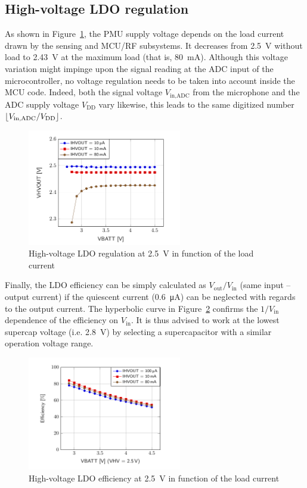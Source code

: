 \documentclass{EPL-master-thesis-covers-EN}
\newcommand{\te}[1]{\textrm{#1}}
\DeclarePairedDelimiter\floor{\lfloor}{\rfloor}
\begin{document}
\subsection*{High-voltage LDO regulation}

As shown in Figure~\ref{fig:LDO_voltage}, the PMU supply voltage depends on the load current drawn by the sensing and MCU/RF subsystems. It decreases from \SI{2.5}{V} without load to \SI{2.43}{V} at the maximum load (that is, \SI{80}{mA}). Although this voltage variation might impinge upon the signal reading at the ADC input of the microcontroller, no voltage regulation needs to be taken into account inside the MCU code. Indeed, both the signal voltage $V_\te{in,ADC}$ from the microphone and the ADC supply voltage $V_\te{DD}$ vary likewise, this leads to the same digitized number $\floor{V_\te{in,ADC}/V_\te{DD}}$.

\begin{figure}[H]
    \centering
    \includegraphics[width=0.6\textwidth]{LDO_voltage.pdf}
    \caption{High-voltage LDO regulation at \SI{2.5}{V} in function of the load current}
    \label{fig:LDO_voltage}
\end{figure}

Finally, the LDO efficiency can be simply calculated as $V_\te{out}/V_\te{in}$ (same input -- output current) if the quiescent current (\SI{0.6}{\micro A}) can be neglected with regards to the output current. The hyperbolic curve in Figure~\ref{fig:LDO_efficiency} confirms the $1/V_\te{in}$ dependence of the efficiency on $V_\te{in}$. It is thus advised to work at the lowest supercap voltage (i.e. \SI{2.8}{V}) by selecting a supercapacitor with a similar operation voltage range.

\begin{figure}[H]
    \centering
    \includegraphics[width=0.6\textwidth]{LDO_efficiency.pdf}
    \caption{High-voltage LDO efficiency at \SI{2.5}{V} in function of the load current}
    \label{fig:LDO_efficiency}
\end{figure}
\end{document}
